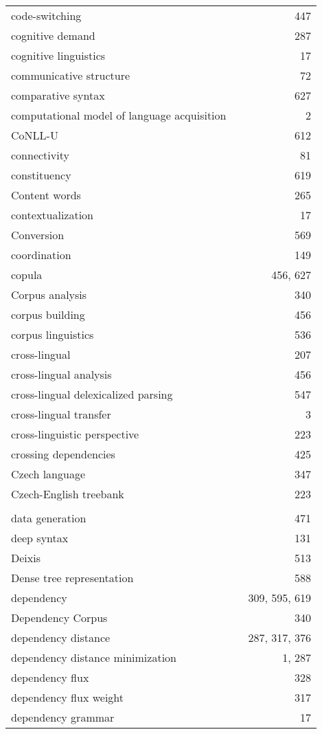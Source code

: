 \documentclass{easychair}
\begin{document}
\begin{longtable}{lp{7em}r}
code-switching & & 447 
\\
cognitive demand & & 287 
\\
cognitive linguistics & & 17 
\\
communicative structure & & 72 
\\
comparative syntax & & 627 
\\
computational model of language acquisition & & 2 
\\
CoNLL-U & & 612 
\\
connectivity & & 81 
\\
constituency & & 619 
\\
Content words & & 265 
\\
contextualization & & 17 
\\
Conversion & & 569 
\\
coordination & & 149 
\\
copula & & 456, 627 
\\
Corpus analysis & & 340 
\\
corpus building & & 456 
\\
corpus linguistics & & 536 
\\
cross-lingual & & 207 
\\
cross-lingual analysis & & 456 
\\
cross-lingual delexicalized parsing & & 547 
\\
cross-lingual transfer & & 3 
\\
cross-linguistic perspective & & 223 
\\
crossing dependencies & & 425 
\\
Czech language & & 347 
\\
Czech-English treebank & & 223 
\\
\\
data generation & & 471 
\\
deep syntax & & 131 
\\
Deixis & & 513 
\\
Dense tree representation & & 588 
\\
dependency & & 309, 595, 619 
\\
Dependency Corpus & & 340 
\\
dependency distance & & 287, 317, 376 
\\
dependency distance minimization & & 1, 287 
\\
dependency flux & & 328 
\\
dependency flux weight & & 317 
\\
dependency grammar & & 17 
\\

\end{longtable}
\end{document}
